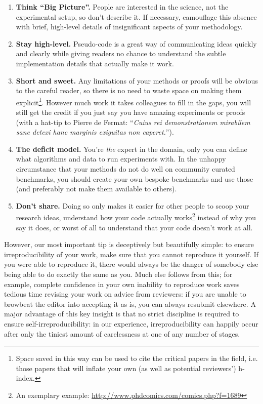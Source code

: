 \documentclass[a4paper,11pt]{article}
\begin{document}
\begin{enumerate}
\item {\textbf{Think ``Big Picture''.}} People are interested in the
science, not the experimental setup, so don't describe it. If
necessary, camouflage this absence with brief, high-level details of
insignificant aspects of your methodology.
\item {\textbf{Stay high-level.}} Pseudo-code is a great way of
communicating ideas quickly and clearly while giving readers no chance
to understand the subtle implementation details that actually make it
work.
\item {\textbf{Short and sweet.}} Any limitations of your
methods or proofs will be obvious to the careful reader, so there is
no need to waste space on making them explicit\footnote{Space saved in
this way can be used to cite the critical papers in the field,
i.e. those papers that will inflate your own (as well as potential
reviewers') h-index.}. However much work it takes colleagues to fill
in the gaps, you will still get the credit if you just say you have
amazing experiments or proofs (with a hat-tip to Pierre de Fermat:
``{\emph{Cuius rei demonstrationem mirabilem sane detexi hanc marginis
exiguitas non caperet.}}'').
\item {\textbf{The deficit model.}} You're \emph{the} expert in the
domain, only you can define what algorithms and data to run
experiments with. In the unhappy circumstance that your methods do not
do well on community curated benchmarks, you should create your own
bespoke benchmarks and use those (and preferably not make them
available to others).
\item {\textbf{Don't share.}} Doing so only makes it easier for other
people to scoop your research ideas, understand how your code actually
works\footnote{An exemplary example:
\url{http://www.phdcomics.com/comics.php?f=1689}} instead of why you
say it does, or worst of all to understand that your code doesn't work
at all.
\end{enumerate}

However, our most important tip is deceptively but beautifully simple:
to ensure irreproducibility of your work, make sure that you cannot
reproduce it yourself. If you were able to reproduce it, there would
always be the danger of somebody else being able to do exactly the
same as you. Much else follows from this; for example, complete
confidence in your own inability to reproduce work saves tedious time
revising your work on advice from reviewers: if you are unable to
browbeat the editor into accepting it as is, you can always resubmit
elsewhere. A major advantage of this key insight is that no strict
discipline is required to ensure self-irreproducibility: in our
experience, irreproducibility can happily occur after only the tiniest
amount of carelessness at one of any number of stages.
\end{document}
